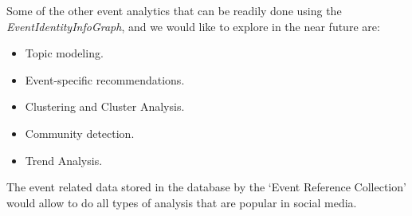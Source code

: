 Some of the other event analytics that can be readily done using the \textit{EventIdentityInfoGraph}, and we would like to explore in the near future are:
\begin{itemize}
\item Topic modeling.
\item Event-specific recommendations.
\item Clustering and Cluster Analysis.
\item Community detection.
\item Trend Analysis.
\end{itemize}

The event related data stored in the database by the `Event Reference Collection' would allow to do all types of analysis that are popular in social media.

